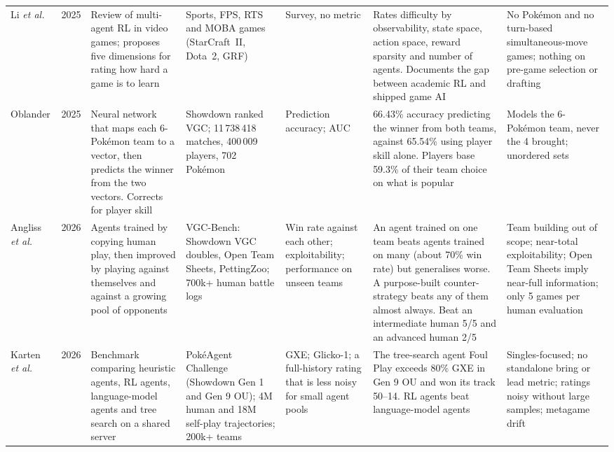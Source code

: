 \documentclass[conference]{IEEEtran}
\begin{document}
\begin{table}[!t]
\begin{tabular}{@{}p{1.4cm}p{0.5cm}p{3.0cm}p{2.8cm}p{2.0cm}p{3.5cm}p{3.3cm}@{}}
Li \emph{et al.} \cite{li2025} & 2025 &
Review of multi-agent RL in video games; proposes five dimensions for rating how hard a game is to learn &
Sports, FPS, RTS and MOBA games (StarCraft~II, Dota~2, GRF) &
Survey, no metric &
Rates difficulty by observability, state space, action space, reward sparsity and number of agents. Documents the gap between academic RL and shipped game AI &
No Pok\'emon and no turn-based simultaneous-move games; nothing on pre-game selection or drafting \\
\addlinespace

Oblander \cite{oblander2025} & 2025 &
Neural network that maps each 6-Pok\'emon team to a vector, then predicts the winner from the two vectors. Corrects for player skill &
Showdown ranked VGC; 11\,738\,418 matches, 400\,009 players, 702 Pok\'emon &
Prediction accuracy; AUC &
66.43\% accuracy predicting the winner from both teams, against 65.54\% using player skill alone. Players base 59.3\% of their team choice on what is popular &
Models the 6-Pok\'emon team, never the 4 brought; unordered sets \\
\addlinespace

Angliss \emph{et al.} \cite{angliss2026} & 2026 &
Agents trained by copying human play, then improved by playing against themselves and against a growing pool of opponents &
VGC-Bench: Showdown VGC doubles, Open Team Sheets, PettingZoo; 700k+ human battle logs &
Win rate against each other; exploitability; performance on unseen teams &
An agent trained on one team beats agents trained on many (about 70\% win rate) but generalises worse. A purpose-built counter-strategy beats any of them almost always. Beat an intermediate human 5/5 and an advanced human 2/5 &
Team building out of scope; near-total exploitability; Open Team Sheets imply near-full information; only 5 games per human evaluation \\
\addlinespace

Karten \emph{et al.} \cite{karten2026} & 2026 &
Benchmark comparing heuristic agents, RL agents, language-model agents and tree search on a shared server &
Pok\'eAgent Challenge (Showdown Gen 1 and Gen 9 OU); 4M human and 18M self-play trajectories; 200k+ teams &
GXE; Glicko-1; a full-history rating that is less noisy for small agent pools &
The tree-search agent Foul Play exceeds 80\% GXE in Gen 9 OU and won its track 50--14. RL agents beat language-model agents &
Singles-focused; no standalone bring or lead metric; ratings noisy without large samples; metagame drift \\
\bottomrule
\end{tabular}
\end{table}
\end{document}

